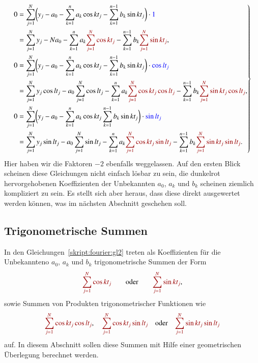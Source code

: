 \begin{equation}
\left.
\begin{aligned}
0&=
\sum_{j=1}^N
\biggl(
y_j - a_0 - \sum_{k=1}^n a_k\cos kt_j - \sum_{k=1}^{n-1} b_k\sin kt_j
\biggr)\cdot\mathstrut{\color{blue}1}
\\
&=
\sum_{j=1}^N y_j
-Na_0
-\sum_{k=1}^n a_k {\color{darkred}\sum_{j=1}^N\cos kt_j}
-\sum_{k=1}^{n-1} b_k {\color{darkred}\sum_{j=1}^N\sin kt_j},
\\
0&=
\sum_{j=1}^N
\biggl(
y_j - a_0 - \sum_{k=1}^n a_k\cos kt_j - \sum_{k=1}^{n-1} b_k\sin kt_j
\biggr)\cdot\mathstrut {\color{blue}\cos lt_j}
\\
&=
\sum_{j=1}^N y_j \cos lt_j
-a_0\sum_{j=1}^N \cos lt_j
-\sum_{k=1}^n a_k {\color{darkred}\sum_{j=1}^N\cos kt_j\cos lt_j}
-\sum_{k=1}^{n-1} b_k {\color{darkred}\sum_{j=1}^N\sin kt_j\cos lt_j},
\\
0
&=
\sum_{j=1}^N
\biggl(
y_j - a_0 - \sum_{k=1}^n a_k\cos kt_j \sum_{k=1}^{n-1} b_k\sin kt_j
\biggr)\cdot\mathstrut {\color{blue}\sin lt_j}
\\
&=
\sum_{j=1}^N y_j \sin lt_j
-a_0\sum_{j=1}^N \sin lt_j
-\sum_{k=1}^n a_k {\color{darkred}\sum_{j=1}^N\cos kt_j\sin lt_j}
-\sum_{k=1}^{n-1} b_k {\color{darkred}\sum_{j=1}^N\sin kt_j\sin lt_j}.
\end{aligned}
\right\}
\label{skript:fourier:gl2}
\end{equation}
Hier haben wir die Faktoren $-2$ ebenfalls weggelassen.
Auf den ersten Blick scheinen diese Gleichungen nicht einfach lösbar zu
sein, die {\color{darkred}dunkelrot} hervorgehobenen Koeffizienten der
Unbekannten $a_0$, $a_k$ und $b_k$ scheinen ziemlich kompliziert zu sein.
Es stellt sich aber heraus, dass diese direkt ausgewertet werden können,
was im nächsten Abschnitt geschehen soll.

\subsection{Trigonometrische Summen}
In den Gleichungen~\eqref{skript:fourier:gl2} treten als Koeffizienten
für die Unbekannteno $a_0$, $a_k$ und $b_k$ trigonometrische Summen
der Form
\begin{equation}
{\color{darkred}
\sum_{j=1}^N \cos kt_j}
\qquad
\text{oder}
\qquad
{\color{darkred}
\sum_{j=1}^N \sin kt_j},
\label{skript:fourier:trigosum}
\end{equation}
sowie Summen von Produkten trigonometrischer Funktionen wie
\begin{equation}
{\color{darkred}\sum_{j=1}^N \cos kt_j\cos lt_j},\quad
{\color{darkred}\sum_{j=1}^N \cos kt_j\sin lt_j}
\quad
\text{oder}
\quad
{\color{darkred}\sum_{j=1}^N \sin kt_j\sin lt_j}
\label{fourier:produkte}
\end{equation}
auf.
In diesem Abschnitt sollen diese Summen mit Hilfe einer geometrischen
Überlegung berechnet werden.

